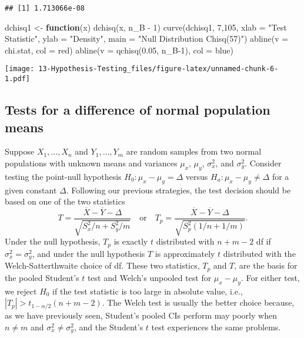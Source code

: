 \documentclass[
]{book}
\newenvironment{Shaded}{\begin{snugshade}}{\end{snugshade}}
\newcommand{\AttributeTok}[1]{\textcolor[rgb]{0.77,0.63,0.00}{#1}}
\newcommand{\ControlFlowTok}[1]{\textcolor[rgb]{0.13,0.29,0.53}{\textbf{#1}}}
\newcommand{\DecValTok}[1]{\textcolor[rgb]{0.00,0.00,0.81}{#1}}
\newcommand{\FloatTok}[1]{\textcolor[rgb]{0.00,0.00,0.81}{#1}}
\newcommand{\FunctionTok}[1]{\textcolor[rgb]{0.00,0.00,0.00}{#1}}
\newcommand{\NormalTok}[1]{#1}
\newcommand{\OtherTok}[1]{\textcolor[rgb]{0.56,0.35,0.01}{#1}}
\newcommand{\SpecialCharTok}[1]{\textcolor[rgb]{0.00,0.00,0.00}{#1}}
\newcommand{\StringTok}[1]{\textcolor[rgb]{0.31,0.60,0.02}{#1}}
\begin{document}
\begin{verbatim}
## [1] 1.713066e-08
\end{verbatim}

\begin{Shaded}
\begin{Highlighting}[]
\NormalTok{dchisq1 }\OtherTok{\textless{}{-}} \ControlFlowTok{function}\NormalTok{(x) }\FunctionTok{dchisq}\NormalTok{(x, n\_B }\SpecialCharTok{{-}} \DecValTok{1}\NormalTok{)}
\FunctionTok{curve}\NormalTok{(dchisq1, }\DecValTok{7}\NormalTok{,}\DecValTok{105}\NormalTok{, }\AttributeTok{xlab =} \StringTok{"Test Statistic"}\NormalTok{, }\AttributeTok{ylab =} \StringTok{"Density"}\NormalTok{, }\AttributeTok{main =} \StringTok{"Null Distribution Chisq(57)"}\NormalTok{)}
\FunctionTok{abline}\NormalTok{(}\AttributeTok{v =}\NormalTok{ chi.stat, }\AttributeTok{col =} \StringTok{\textquotesingle{}red\textquotesingle{}}\NormalTok{)}
\FunctionTok{abline}\NormalTok{(}\AttributeTok{v =} \FunctionTok{qchisq}\NormalTok{(}\FloatTok{0.05}\NormalTok{, n\_B}\DecValTok{{-}1}\NormalTok{), }\AttributeTok{col =} \StringTok{\textquotesingle{}blue\textquotesingle{}}\NormalTok{)}
\end{Highlighting}
\end{Shaded}

\texttt{[image: 13-Hypothesis-Testing\_files/figure-latex/unnamed-chunk-6-1.pdf]}

\hypertarget{tests-for-a-difference-of-normal-population-means}{%
\subsection{Tests for a difference of normal population means}\label{tests-for-a-difference-of-normal-population-means}}

Suppose \(X_1, \ldots, X_n\) and \(Y_1, \ldots, Y_m\) are random samples from two normal populations with unknown means and variances \(\mu_x\), \(\mu_y\), \(\sigma_x^2\), and \(\sigma_y^2\). Consider testing the point-null hypothesis \(H_0:\mu_x - \mu_y = \Delta\) versus \(H_a:\mu_x - \mu_y \ne \Delta\) for a given constant \(\Delta\). Following our previous strategies, the test decision should be based on one of the two statistics
\[T = \frac{\overline X - \overline Y - \Delta}{\sqrt{S_x^2/n + S_y^2/m}} \quad \text{or}\quad T_p = \frac{\overline X - \overline Y - \Delta}{\sqrt{S_p^2\left(1/n+1/m\right)}}.\]
Under the null hypothesis, \(T_p\) is exactly \(t\) distributed with \(n+m-2\) df if \(\sigma_x^2 = \sigma_y^2\), and under the null hypothesis \(T\) is approximately \(t\) distributed with the Welch-Satterthwaite choice of df. These two statistics, \(T_p\) and \(T\), are the basis for the pooled Student's \(t\) test and Welch's unpooled test for \(\mu_x - \mu_y\). For either test, we reject \(H_0\) if the test statistic is too large in absolute value, i.e., \(|T_p|>t_{1-\alpha/2}(n+m-2)\). The Welch test is usually the better choice because, as we have previously seen, Student's pooled CIs perform may poorly when \(n\ne m\) and \(\sigma_x^2 \ne \sigma_y^2\), and the Student's \(t\) test experiences the same problems.
\end{document}
